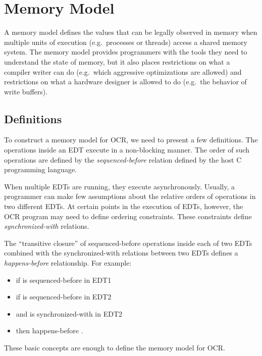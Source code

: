 %
%

%
\section{Memory Model}
\label{sec:MemoryModel}
A memory model defines the values that can be legally observed in
memory when multiple units of execution (e.g.\ processes or threads)
access a shared memory system. The memory model provides programmers
with the tools they need to understand the state of memory, but it
also places restrictions on what a compiler writer can do (e.g.\ which
aggressive optimizations are allowed) and restrictions on what a
hardware designer is allowed to do (e.g.\ the behavior of write
buffers).
\subsection{Definitions}
To construct a memory model for OCR, we need to present a few
definitions. The operations inside an EDT execute in a non-blocking
manner. The order of such operations are defined by the
\emph{sequenced-before} relation defined by
the host C programming language.

When multiple EDTs are running, they execute asynchronously. Usually,
a programmer can make few assumptions about the relative orders of
operations in two different EDTs. At certain points in the execution
of EDTs, however, the OCR program may need to define ordering
constraints. These constraints define
\emph{synchronized-with} relations.

The ``transitive closure'' of sequenced-before operations inside each
of two EDTs combined with the synchronized-with relations between two
EDTs defines a \emph{happens-before}
relationship. For example:
\begin{itemize}
\item if  is sequenced-before  in EDT1
\item if  is sequenced-before  in EDT2
\item and  is synchronized-with  in EDT2
\item then  happens-before .
\end{itemize}
These basic concepts are enough to define the memory model for OCR.

